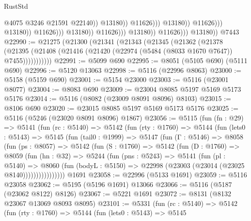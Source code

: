 \begin{lexlean}{RustStd}
\begin{coremodule}
{\begin{coremodule}
{{{{{{{{{{{{{{{{{{{{{{{{{{{{{{{                                                              @4075
                                                              @3246
                                                              @21591
                                                              @22140))
                                                          @13180))
                                                      @11626)))
                                                @13180))
                                            @11626)))
                                      @13180))
                                  @11626)))
                            @13180))
                        @11626)))
                  @13180))
              @11626)))
        @13180))
    @7443
@22990 := @21275
    (@21300
      (@21341
        (@21343
          (@21345
            (@21362
              (@21378
                (@21395 (@21408 (@21416 (@21420 (@22974 (@5484 (@8033 @1670 @7647)) @7455)))))))))))
@22991 := @5099 @690
@22995 := @8051 (@5105 @690) (@5111 @690)
@22996 := @5120 @13063
@22998 := @5116 (@22996 @8063)
@23000 := @5158 (@5159 @690)
@23001 := @5154 @23000
@23003 := @5116 (@23001 @8077)
@23004 := @8083 @690
@23009 := @23004 @8085 @5197 @5169 @5173 @5176
@23014 := @5116 (@8082 (@23009 @8091 @8096) @8103)
@23015 := @8106 @690
@23020 := @23015 @8085 @5197 @5169 @5173 @5176
@23025 := @5116 (@5246 (@23020 @8091 @8096) @1867)
@23056 := @5115
    (fun (fn : @29) =>
    @5141
      (fun (rc : @5140) =>
      @5142
        (fun (rty : @1760) =>
        @5144
          (fun (lets0 : @5143) =>
          @5145
            (fun (tail0 : @1999) =>
            @5147
              (fun (Γ : @5146) =>
              @8058
                (fun (ps : @8057) =>
                @5142
                  (fun (S : @1760) =>
                  @5142
                    (fun (D : @1760) =>
                    @8059
                      (fun (hn : @32) =>
                      @5244
                        (fun (pns : @5243) =>
                        @5141
                          (fun (pl : @5140) =>
                          @8060
                            (fun (bodyL : @5150) =>
                            @22998 (@23003 (@23014 (@23025 @8140))))))))))))))))
    @1691
@23058 := @22996 (@5133 @1691)
@23059 := @5116 @23058
@23062 := @5195 (@5196 @1691) @13066
@23066 := @5116 (@5187 (@23062 @8122) @8126)
@23067 := @5221 @1691
@23072 := @8131 (@8132 @23067 @13069 @8093 @8095)
@23101 := @5331
    (fun (rc : @5140) =>
    @5142
      (fun (rty : @1760) =>
      @5144
        (fun (lets0 : @5143) =>
        @5145
}}}}}}}}}}}}}}}}}}}}}}}}}}}}}}}
\end{coremodule}}
\end{coremodule}
\end{lexlean}

